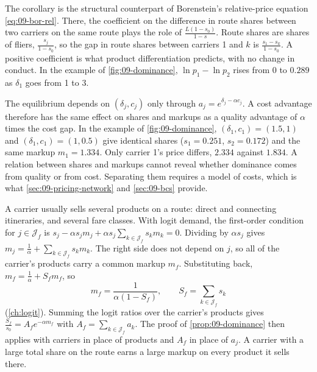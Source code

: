 The corollary is the structural counterpart of Borenstein's relative-price equation
\eqref{eq:09-bor-rel}. There, the coefficient on the difference in route shares between two carriers on
the same route plays the role of $\frac{L(1-s_0)}{1-s}$. Route shares are shares of fliers,
$\frac{s_j}{1-s_0}$, so the gap in route shares between carriers 1 and $k$ is $\frac{s_1-s_k}{1-s_0}$.
A positive coefficient is what product differentiation
predicts, with no change in conduct. In the example of \cref{fig:09-dominance}, $\ln p_1-\ln p_2$ rises
from $0$ to $0.289$ as $\delta_1$ goes from 1 to 3.

\begin{remark}\label{rem:09-quality-cost}
The equilibrium depends on $(\delta_j,c_j)$ only through $a_j=e^{\delta_j-\alpha c_j}$. A cost advantage
therefore has the same effect on shares and markups as a quality advantage of $\alpha$ times the cost
gap. In the example of \cref{fig:09-dominance}, $(\delta_1,c_1)=(1.5,1)$ and $(\delta_1,c_1)=(1,0.5)$
give identical shares ($s_1=0.251$, $s_2=0.172$) and the same markup $m_1=1.334$. Only carrier 1's price
differs, $2.334$ against $1.834$. A relation between shares and markups cannot reveal whether dominance
comes from quality or from cost. Separating them requires a model of costs, which is what
\cref{sec:09-pricing-network} and \cref{sec:09-bcs} provide.
\end{remark}

A carrier usually sells several products on a route: direct and connecting itineraries, and several fare
classes. With logit demand, the first-order condition for $j\in\mathcal{J}_f$ is
$s_j-\alpha s_jm_j+\alpha s_j\sum_{k\in\mathcal{J}_f}s_km_k=0$. Dividing by $\alpha s_j$ gives
$m_j=\frac{1}{\alpha}+\sum_{k\in\mathcal{J}_f}s_km_k$. The right side does not depend on $j$, so all of
the carrier's products carry a common markup $m_f$. Substituting back,
$m_f=\frac{1}{\alpha}+S_fm_f$, so
\begin{equation*}
m_f=\frac{1}{\alpha(1-S_f)},\qquad S_f=\sum_{k\in\mathcal{J}_f}s_k
\end{equation*}
(\cref{ch:logit}). Summing the logit ratios over the carrier's products gives
$\frac{S_f}{s_0}=A_fe^{-\alpha m_f}$ with $A_f=\sum_{k\in\mathcal{J}_f}a_k$. The proof of
\cref{prop:09-dominance} then applies with carriers in place of products and $A_f$ in place of $a_j$.
A carrier with a large total share on the route earns a large markup on every product it sells there.

